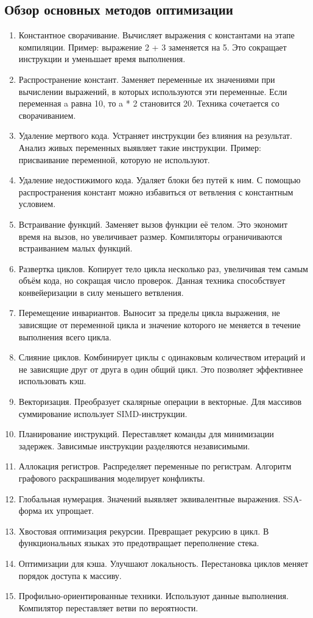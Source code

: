 \subsection{Обзор основных методов оптимизации}

\begin{enumerate}
\item Константное сворачивание. Вычисляет выражения с константами на этапе компиляции. Пример: выражение 2 + 3 заменяется на 5. Это сокращает инструкции и уменьшает время выполнения.
\item Распространение констант. Заменяет переменные их значениями при вычислении выражений, в которых используются эти переменные. Если переменная a равна 10, то a * 2 становится 20. Техника сочетается со сворачиванием.
\item Удаление мертвого кода. Устраняет инструкции без влияния на результат. Анализ живых переменных выявляет такие инструкции. Пример: присваивание переменной, которую не используют.
\item Удаление недостижимого кода. Удаляет блоки без путей к ним. С помощью распространения констант можно избавиться от ветвления с константным условием.
\item Встраивание функций. Заменяет вызов функции её телом. Это экономит время на вызов, но увеличивает размер. Компиляторы ограничиваются встраиванием малых функций.
\item Развертка циклов. Копирует тело цикла несколько раз, увеличивая тем самым объём кода, но сокращая число проверок. Данная техника способствует конвейеризации в силу меньшего ветвления.
\item Перемещение инвариантов. Выносит за пределы цикла выражения, не зависящие от переменной цикла и значение которого не меняется в течение выполнения всего цикла.
\item Слияние циклов. Комбинирует циклы с одинаковым количеством итераций и не зависящие друг от друга в один общий цикл. Это позволяет эффективнее использовать кэш.
\item Векторизация. Преобразует скалярные операции в векторные. Для массивов суммирование использует SIMD-инструкции.
\item Планирование инструкций. Переставляет команды для минимизации задержек. Зависимые инструкции разделяются независимыми.
\item Аллокация регистров. Распределяет переменные по регистрам. Алгоритм графового раскрашивания моделирует конфликты.
\item Глобальная нумерация. Значений выявляет эквивалентные выражения. SSA-форма их упрощает.
\item Хвостовая оптимизация рекурсии. Превращает рекурсию в цикл. В функциональных языках это предотвращает переполнение стека.
\item Оптимизации для кэша. Улучшают локальность. Перестановка циклов меняет порядок доступа к массиву.
\item Профильно-ориентированные техники. Используют данные выполнения. Компилятор переставляет ветви по вероятности.
\end{enumerate}

